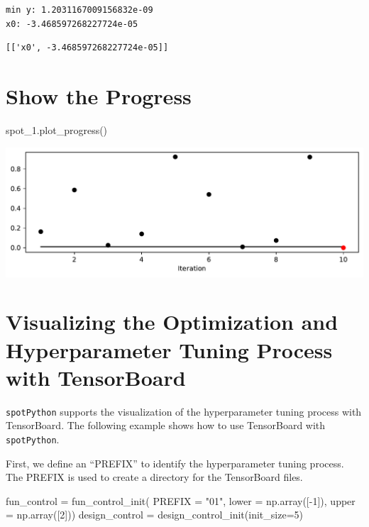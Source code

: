 \documentclass[
  letterpaper,
  DIV=11,
  numbers=noendperiod]{scrreprt}
\newenvironment{Shaded}{\begin{snugshade}}{\end{snugshade}}
\newcommand{\DecValTok}[1]{\textcolor[rgb]{0.68,0.00,0.00}{#1}}
\newcommand{\NormalTok}[1]{\textcolor[rgb]{0.00,0.23,0.31}{#1}}
\newcommand{\OperatorTok}[1]{\textcolor[rgb]{0.37,0.37,0.37}{#1}}
\newcommand{\StringTok}[1]{\textcolor[rgb]{0.13,0.47,0.30}{#1}}
\begin{document}
\begin{verbatim}
min y: 1.2031167009156832e-09
x0: -3.468597268227724e-05
\end{verbatim}

\begin{verbatim}
[['x0', -3.468597268227724e-05]]
\end{verbatim}

\section{Show the Progress}\label{show-the-progress-1}

\begin{Shaded}
\begin{Highlighting}[]
\NormalTok{spot\_1.plot\_progress()}
\end{Highlighting}
\end{Shaded}

\includegraphics{007_num_spot_intro_files/figure-pdf/cell-11-output-1.pdf}

\section{Visualizing the Optimization and Hyperparameter Tuning Process
with TensorBoard}\label{sec-visualizing-tensorboard-01}

\texttt{spotPython} supports the visualization of the hyperparameter
tuning process with TensorBoard. The following example shows how to use
TensorBoard with \texttt{spotPython}.

First, we define an ``PREFIX'' to identify the hyperparameter tuning
process. The PREFIX is used to create a directory for the TensorBoard
files.

\begin{Shaded}
\begin{Highlighting}[]
\NormalTok{fun\_control }\OperatorTok{=}\NormalTok{ fun\_control\_init(}
\NormalTok{    PREFIX }\OperatorTok{=} \StringTok{"01"}\NormalTok{,}
\NormalTok{    lower }\OperatorTok{=}\NormalTok{ np.array([}\OperatorTok{{-}}\DecValTok{1}\NormalTok{]),}
\NormalTok{    upper }\OperatorTok{=}\NormalTok{ np.array([}\DecValTok{2}\NormalTok{]))}
\NormalTok{design\_control }\OperatorTok{=}\NormalTok{ design\_control\_init(init\_size}\OperatorTok{=}\DecValTok{5}\NormalTok{)}
\end{Highlighting}
\end{Shaded}
\end{document}
